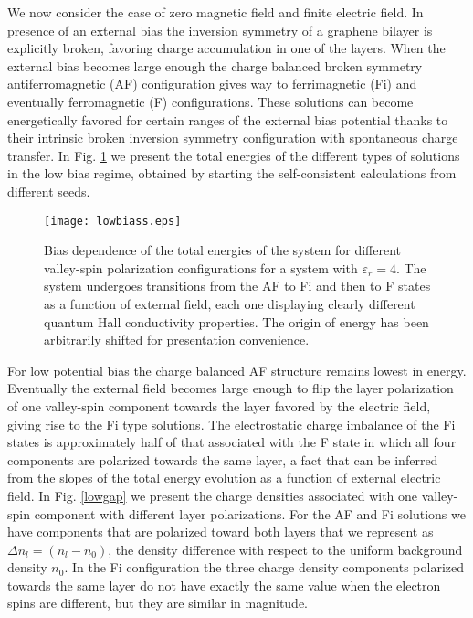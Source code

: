 \documentclass[twocolumn,prb,showpacs,preprintnumbers,amsmath,amssymb]{revtex4}
\begin{document}
We now consider the case of zero magnetic field and finite electric field.
In presence of an external bias the inversion symmetry of a graphene bilayer is explicitly broken,
favoring charge accumulation in one of the layers.
When the external bias becomes large enough the charge balanced broken symmetry antiferromagnetic (AF) 
configuration gives way to ferrimagnetic (Fi) and eventually ferromagnetic (F) configurations.
These solutions can become energetically favored for certain ranges of the external bias potential
thanks to their intrinsic broken inversion symmetry configuration with spontaneous charge transfer.
In Fig. \ref{lowbias} we present the total energies of the different types of solutions in the low bias regime,
obtained by starting the self-consistent calculations from different seeds.
\begin{figure}[htbp]
\begin{center}
\texttt{[image: lowbiass.eps]} 
\caption{
Bias dependence of the total energies of the system for different 
valley-spin polarization configurations for a system with $\varepsilon_r = 4$. 
The system undergoes transitions from the AF to Fi and then to F states as a function of external field, 
each one displaying clearly different quantum Hall conductivity properties. 
The origin of energy has been arbitrarily shifted for presentation convenience.
}
\label{lowbias}
\end{center}
\end{figure}
For low potential bias the charge balanced AF structure remains lowest in energy.
Eventually the external field becomes large enough to flip the layer polarization of one valley-spin
component towards the layer favored by the electric field, giving rise to the Fi type solutions.
The electrostatic charge imbalance of the Fi states is approximately half of that associated with the F state
in which all
four components are polarized towards the same layer, 
a fact that can be inferred from the slopes of the total energy evolution as a function 
of external electric field.
In Fig. \ref{lowgap} we present the charge densities associated with one valley-spin component
with different layer polarizations.
For the AF and Fi solutions we have components that are polarized toward both layers
that we represent as $\Delta n_l = (n_l - n_0)$, the density difference with respect to the uniform background density $n_0$.  
In the Fi configuration the three charge density components polarized towards the same layer do not have exactly the 
same value when the electron spins are different, but they are similar in magnitude.
\end{document}
